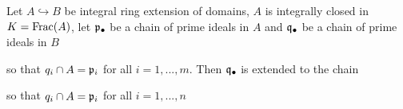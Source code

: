 \begin{theorem}
	Let $A \hookrightarrow B$ be integral ring extension of domains, $A$ is integrally closed in $K = \operatorname{Frac}(A)$, let $\mathfrak{p}_\bullet$ be a chain of prime ideals in $A$ and $\mathfrak{q}_\bullet$ be a chain of prime ideals in $B$
	\begin{center}
	\end{center}
	so that $q_i \cap A = \mathfrak{p}_i$ for all $i=1, ..., m$. Then $\mathfrak{q}_\bullet$ is extended to the chain
	\begin{center}
	\end{center}
	so that $q_i \cap A = \mathfrak{p}_i$ for all $i=1, ..., n$
\end{theorem}